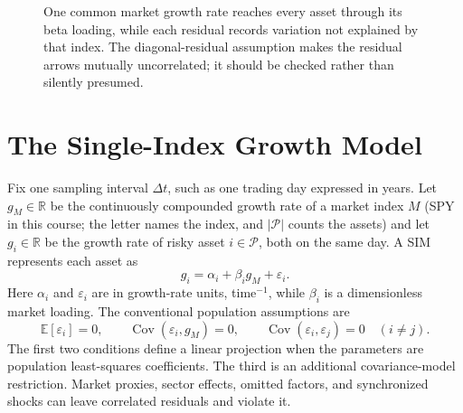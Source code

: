\documentclass[11pt]{article}
\newcommand{\R}{\mathbb{R}}
\newcommand{\E}{\mathbb{E}}
\newcommand{\Cov}{\operatorname{Cov}}
\newcommand{\np}{|\mathcal P|}
\begin{document}
\begin{figure}[ht]
  \centering
  \caption{One common market growth rate reaches every asset through its beta loading, while each residual records variation not explained by that index. The diagonal-residual assumption makes the residual arrows mutually uncorrelated; it should be checked rather than silently presumed.}
  \label{fig:sim-graph}
\end{figure}

\section{The Single-Index Growth Model}

Fix one sampling interval $\Delta t$, such as one trading day expressed in years. Let $g_M\in\R$ be the continuously compounded growth rate of a market index $M$ (SPY in this course; the letter names the index, and $\np$ counts the assets) and let $g_i\in\R$ be the growth rate of risky asset $i\in\mathcal P$, both on the same day. A SIM represents each asset as
\begin{equation}
  \label{eq:sim-scalar}
  g_i=\alpha_i+\beta_i g_M+\varepsilon_i.
\end{equation}
Here $\alpha_i$ and $\varepsilon_i$ are in growth-rate units, time$^{-1}$, while $\beta_i$ is a dimensionless market loading. The conventional population assumptions are
\begin{equation}
  \label{eq:sim-assumptions}
  \E[\varepsilon_i]=0,
  \qquad
  \Cov(\varepsilon_i,g_M)=0,
  \qquad
  \Cov(\varepsilon_i,\varepsilon_j)=0\quad(i\neq j).
\end{equation}
The first two conditions define a linear projection when the parameters are population least-squares coefficients. The third is an additional covariance-model restriction. Market proxies, sector effects, omitted factors, and synchronized shocks can leave correlated residuals and violate it.
\end{document}
